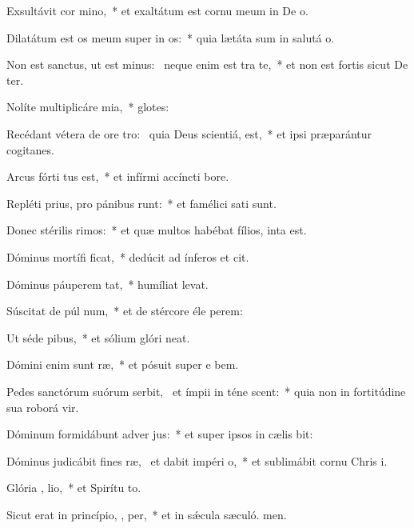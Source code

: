 \item Exsultávit cor   mino,~* et exaltátum est cornu meum in De o.
\item Dilatátum est os meum super in os:~* quia lætáta sum in salutá o.
\item Non est sanctus, ut est minus:~\pscross{} neque enim est  tra te,~* et non est fortis sicut De ter.
\item Nolíte multiplicáre  mia,~* glotes:
\item Recédant vétera de ore tro:~\pscross{} quia Deus scientiá,  est,~* et ipsi præparántur cogitanes.
\item Arcus fórti tus est,~* et infírmi accíncti  bore.
\item Repléti prius, pro pánibus  runt:~* et famélici sati sunt.
\item Donec stérilis  rimos:~* et quæ multos habébat fílios, inta est.
\item Dóminus mortífi  ficat,~* dedúcit ad ínferos et cit.
\item Dóminus páuperem   tat,~* humíliat  levat.
\item Súscitat de púl num,~* et de stércore éle perem:
\item Ut séde  pibus,~* et sólium glóri neat.
\item Dómini enim sunt  ræ,~* et pósuit super e bem.
\item Pedes sanctórum suórum serbit,~\pscross{} et ímpii in téne scent:~* quia non in fortitúdine sua roborá vir.
\item Dóminum formidábunt adver jus:~* et super ipsos in cælis bit:
\item Dóminus judicábit fines ræ,~\pscross{} et dabit impéri  o,~* et sublimábit cornu Chris i.
\item Glória ,  lio,~* et Spirítu to.
\item Sicut erat in princípio,  ,  per,~* et in sǽcula sæculó. men.
